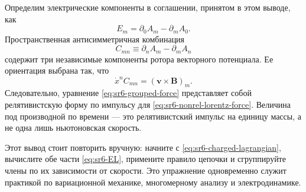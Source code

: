 Определим электрические компоненты в соглашении, принятом в этом выводе, как
\begin{equation}
E_m=\partial_0A_m-\partial_mA_0.
\label{eq:sr6-electric-from-potential}
\end{equation}
Пространственная антисимметричная комбинация
\begin{equation}
C_{mn}
\equiv
\partial_nA_m-\partial_mA_n
\label{eq:sr6-spatial-curl-tensor}
\end{equation}
содержит три независимые компоненты ротора векторного потенциала. Ее ориентация выбрана так, что
\begin{equation}
\dot x^nC_{mn}
=
\left(\mathbf v\times\mathbf B\right)_m.
\end{equation}
Следовательно, уравнение \eqref{eq:sr6-grouped-force} представляет собой релятивистскую форму по импульсу для \eqref{eq:sr6-nonrel-lorentz-force}. Величина под производной по времени — это релятивистский импульс на единицу массы, а не одна лишь ньютоновская скорость.

Этот вывод стоит повторить вручную: начните с \eqref{eq:sr6-charged-lagrangian}, вычислите обе части \eqref{eq:sr6-EL}, примените правило цепочки и сгруппируйте члены по их зависимости от скорости. Это упражнение одновременно служит практикой по вариационной механике, многомерному анализу и электродинамике.

\begin{classroomqa}
\end{classroomqa}

\begin{classroomqa}
\end{classroomqa}

